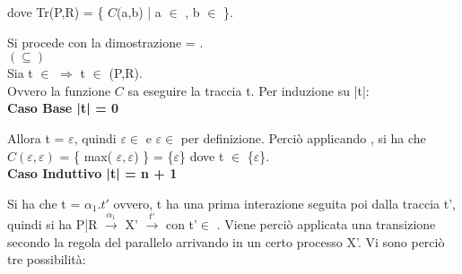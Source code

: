 dove Tr(P,R) = \{ $C$(a,b) | a $\in$ , b $\in$ \}.

Si procede con la dimostrazione  = .\\

$(\subseteq)$ 
\\

Sia t $\in$   $\Rightarrow$  t $\in$ (P,R).\\
Ovvero la funzione $C$ sa eseguire la traccia t.
Per induzione su |t|:\\

\textbf{Caso Base |t| = 0}

Allora t = $\varepsilon$, quindi $\varepsilon \in$  e $\varepsilon \in$  per definizione. Perciò applicando , si ha che $C(\varepsilon, \varepsilon)$ = \{ max( $\varepsilon, \varepsilon$)  \} = \{$\varepsilon$\} dove t $\in$ \{$\varepsilon$\}.\\

\textbf{Caso Induttivo |t| = n + 1}

Si ha che t = $\alpha_{1}.t'$ ovvero, t ha una prima interazione seguita poi dalla traccia t', quindi si ha P|R $ \overset{\alpha_{1}}\rightarrow $ X' $\overset{t'}\rightarrow$ con t'$\in$ . Viene perciò applicata una transizione secondo la regola del parallelo arrivando in un certo processo X'. Vi sono perciò tre possibilità:

